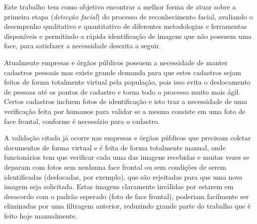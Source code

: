 Este trabalho tem como objetivo encontrar a melhor forma de atuar sobre a primeira etapa (\textit{detecção facial}) do processo de reconhecimento facial, avaliando o desempenho qualitativo e quantitativo de diferentes metodologias e ferramentas disponíveis e permitindo a rápida identificação de imagens que não possuem uma face, para satisfazer a necessidade descrita a seguir.

Atualmente empresas e órgãos públicos possuem a necessidade de manter cadastros pessoais mas existe grande demanda para que estes cadastros sejam feitos de forma totalmente virtual pela população, pois isso evita o deslocamento de pessoas até os pontos de cadastro e torna todo o processo muito mais ágil. Certos cadastros incluem fotos de identificação e isto traz a necessidade de uma verificação feita por humanos para validar se a mesma consiste em uma foto de face frontal, conforme é necessário para o cadastro.

A validação citada já ocorre nas empresas e órgãos públicos que precisam coletar documentos de forma virtual e é feita de forma totalmente manual, onde funcionários tem que verificar cada uma das imagens recebidas e muitas vezes se deparam com fotos sem nenhuma face frontal ou sem condições de serem identificadas (desfocadas, por exemplo), que são rejeitadas para que uma nova imagem seja solicitada. Estas imagens claramente inválidas por estarem em desacordo com o padrão esperado (foto de face frontal), poderiam facilmente ser eliminadas por uma filtragem anterior, reduzindo grande parte do trabalho que é feito hoje manualmente.